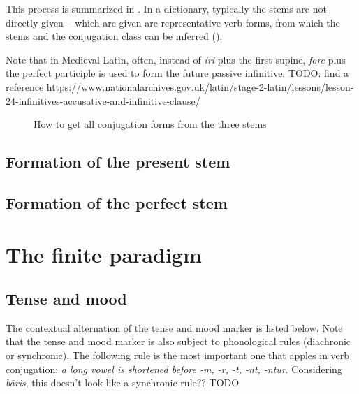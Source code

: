\documentclass[a4paper, oneside]{report}
\newcommand{\corpus}[1]{\emph{#1}}
\begin{document}
This process is summarized in .
In a dictionary, 
typically the stems are not directly given 
-- which are given are representative verb forms,
from which the stems and the conjugation class can be inferred 
().

Note that in Medieval Latin, often,
instead of \corpus{iri} plus the first supine,
\corpus{fore} plus the perfect participle is used to form the future passive infinitive.
TODO: find a reference https://www.nationalarchives.gov.uk/latin/stage-2-latin/lessons/lesson-24-infinitives-accusative-and-infinitive-clause/

\begin{sidewaysfigure}
    \centering
    
    \caption{How to get all conjugation forms from the three stems}
    \label{fig:stem-to-form}
\end{sidewaysfigure}

\subsection{Formation of the present stem}



\subsection{Formation of the perfect stem}\label{sec:verb-inflection.stem.perfect}

\section{The finite paradigm}\label{sec:finite-paradigm}

\subsection{Tense and mood}\label{sec:tense-mood-marking}

The contextual alternation of the tense and mood marker is listed below.
Note that the tense and mood marker is also subject to phonological rules 
(diachronic or synchronic).
The following rule is the most important one that apples in verb conjugation:
\emph{a long vowel is shortened before \corpus{-m}, \corpus{-r}, \corpus{-t}, \corpus{-nt}, \corpus{-ntur}}.
Considering \corpus{b\={a}ris},
this doesn't look like a synchronic rule?? TODO
\end{document}
